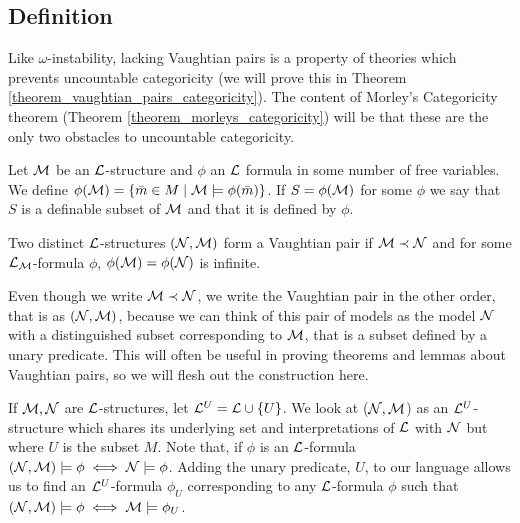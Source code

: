 \subsection{Definition}
Like \(\omega\)-instability, lacking Vaughtian pairs is a property of theories which prevents uncountable categoricity (we will prove this in Theorem \ref{theorem_vaughtian_pairs_categoricity}).
The content of Morley's Categoricity theorem (Theorem \ref{theorem_morleys_categoricity}) will be that these are the only two obstacles to uncountable categoricity. 

\begin{definition}\label{definition_definable_subset}
Let \(\mathcal{M}\) be an \(\mathcal{L}\)-structure and \(\phi\) an \(\mathcal{L}\) formula in some number of free variables.
We define \(\phi(\mathcal{M}) = \{\bar{m} \in M \mid \mathcal{M} \models \phi(\bar{m})\}\).
If \(S = \phi(\mathcal{M})\) for some \(\phi\) we say that \(S\) is a definable subset of \(\mathcal{M}\) and that it is defined by \(\phi\).
\end{definition}

\begin{definition}\label{definition_vaughtian_pairs}
Two distinct \(\mathcal{L}\)-structures \((\mathcal{N}, \mathcal{M})\) form a Vaughtian pair if \(\mathcal{M} \prec \mathcal{N}\) and for some \(\mathcal{L}_{\mathcal{M}}\)-formula \(\phi\), \(\phi(\mathcal{M}) = \phi(\mathcal{N})\) is infinite. 
\end{definition}

Even though we write \(\mathcal{M} \prec \mathcal{N}\), we write the Vaughtian pair in the other order, that is as \((\mathcal{N}, \mathcal{M})\), because we can think of this pair of models as the model \(\mathcal{N}\) with a distinguished subset corresponding to \(\mathcal{M}\), that is a subset defined by a unary predicate.
This will often be useful in proving theorems and lemmas about Vaughtian pairs, so we will flesh out the construction here. 

If \(\mathcal{M}, \mathcal{N}\) are \(\mathcal{L}\)-structures, let  \(\mathcal{L}^U = \mathcal{L} \cup \{U\}\). 
We look at (\(\mathcal{N}, \mathcal{M}\)) as an \(\mathcal{L}^U\)-structure which shares its underlying set and interpretations of \(\mathcal{L}\) with \(\mathcal{N}\) but where \(U\) is the subset \(M\). 
Note that, if \(\phi\) is an \(\mathcal{L}\)-formula \((\mathcal{N}, \mathcal{M}) \models \phi \iff \mathcal{N} \models \phi\).
Adding the unary predicate, \(U\), to our language allows us to find an \(\mathcal{L}^U\)-formula \(\phi_U\) corresponding to any \(\mathcal{L}\)-formula \(\phi\) such that \((\mathcal{N}, \mathcal{M}) \models \phi \iff \mathcal{M} \models \phi_U\).

